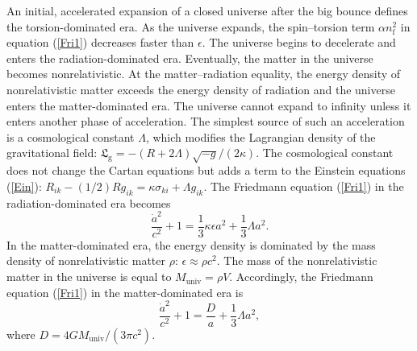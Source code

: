 \documentclass[prd,onecolumn,nofootinbib]{revtex4}
\begin{document}
An initial, accelerated expansion of a closed universe after the big bounce defines the torsion-dominated era.
As the universe expands, the spin--torsion term $\alpha n_\textrm{f}^2$ in equation (\ref{Fri1}) decreases faster than $\epsilon$.
The universe begins to decelerate and enters the radiation-dominated era.
Eventually, the matter in the universe becomes nonrelativistic.
At the matter--radiation equality, the energy density of nonrelativistic matter exceeds the energy density of radiation and the universe enters the matter-dominated era.
The universe cannot expand to infinity unless it enters another phase of acceleration.
The simplest source of such an acceleration is a cosmological constant $\Lambda$, which modifies the Lagrangian density of the gravitational field: $\mathfrak{L}_\textrm{g}=-(R+2\Lambda)\sqrt{-g}/(2\kappa)$.
The cosmological constant does not change the Cartan equations but adds a term to the Einstein equations (\ref{Ein}): $R_{ik}-(1/2)Rg_{ik}=\kappa\sigma_{ki}+\Lambda g_{ik}$.
The Friedmann equation (\ref{Fri1}) in the radiation-dominated era becomes
\begin{equation}
\frac{{\dot{a}}^2}{c^2}+1=\frac{1}{3}\kappa\epsilon a^2+\frac{1}{3}\Lambda a^2.
\label{Fri3}
\end{equation}
In the matter-dominated era, the energy density is dominated by the mass density of nonrelativistic matter $\rho$: $\epsilon\approx\rho c^2$.
The mass of the nonrelativistic matter in the universe is equal to $M_\textrm{univ}=\rho V$.
Accordingly, the Friedmann equation (\ref{Fri1}) in the matter-dominated era is
\begin{equation}
\frac{{\dot{a}}^2}{c^2}+1=\frac{D}{a}+\frac{1}{3}\Lambda a^2,
\label{Fri4}
\end{equation}
where $D=4GM_\textrm{univ}/(3\pi c^2)$.
\end{document}
